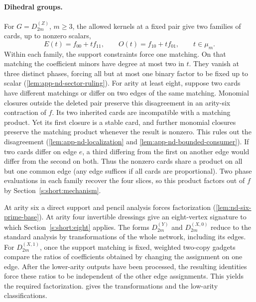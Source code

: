 \documentclass[11pt,letterpaper,onecolumn]{article}
\theoremstyle{plain}
\theoremstyle{definition}
\theoremstyle{remark}
\newcommand{\DihZ}[1]{{D_{#1}^{(Z)}}}
\newcommand{\DihY}[1]{{D_{#1}^{(Y)}}}
\newcommand{\DihXzero}[1]{{D_{#1}^{(X,0)}}}
\newcommand{\DihXone}[1]{{D_{#1}^{(X,1)}}}
\begin{document}
\paragraph{Dihedral groups.}
For \(G=\DihZ{2m}\), \(m\ge3\), the allowed kernels at a fixed pair
give two families of cards, up to nonzero scalars,
\[
 E(t)=f_{00}+t f_{11},\qquad O(t)=f_{10}+t f_{01},
 \qquad t\in\mu_m.
\]
Within each family, the support constraints force one matching.
On that matching the coefficient minors have degree at most two in
\(t\). They vanish at three distinct phases, forcing all but at most
one binary factor to be fixed up to scalar (\cref{lem:app-nd-sector-ruling}). For arity at least eight, suppose
two cards have different matchings or differ on two edges of the same
matching. Monomial closures outside the deleted pair preserve this
disagreement in an arity-six contraction of \(f\). Its two inherited
cards are incompatible with a matching product. Yet its first closure
is a stable card, and further monomial closures preserve the matching
product whenever the result is nonzero. This rules out the disagreement (\cref{lem:app-nd-localization} and \cref{lem:app-nd-bounded-consumer}).
If two cards differ on edge \(e\), a third differing from the first
on another edge would differ from the second on both. Thus the
nonzero cards share a product on all but one common edge (any edge
suffices if all cards are proportional).
Two phase evaluations in each family recover the four slices, so this
product factors out of \(f\) by Section~\ref{s:short:mechanism}.

At arity six a direct support and pencil analysis forces factorization
(\cref{lem:nd-six-prime-base}). At arity four invertible
dressings give an eight-vertex signature to which
Section~\ref{s:short:eight} applies. The forms \(\DihY{2m}\) and
\(\DihXzero{2m}\) reduce to the standard analysis by transformations of
the whole network, including its edges. For \(\DihXone{2m}\), once the
support matching is fixed, weighted two-copy gadgets compare the ratios
of coefficients obtained by changing the assignment on one edge.
After the lower-arity outputs have been processed, the resulting
identities force these ratios to be independent of the other edge
assignments. This yields the required factorization.  gives the transformations and
the low-arity classifications.
\end{document}
